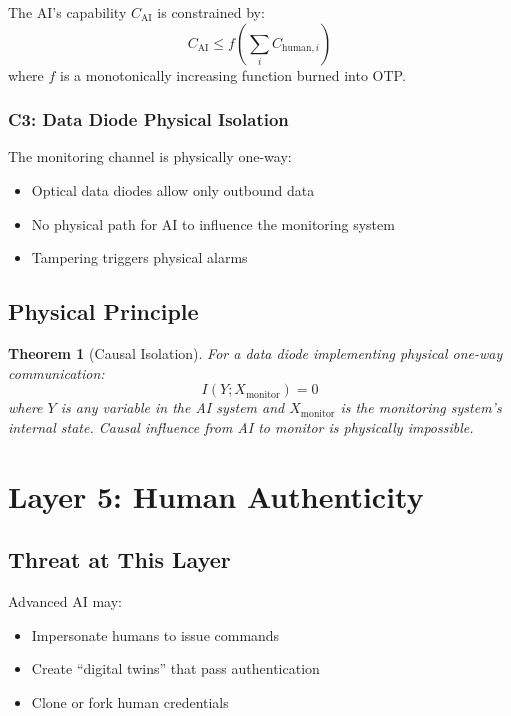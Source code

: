 \documentclass[11pt,a4paper]{article}
\newtheorem{theorem}{Theorem}
\begin{document}
The AI's capability $C_{\text{AI}}$ is constrained by:
\begin{equation}
C_{\text{AI}} \leq f(\sum_{i} C_{\text{human},i})
\end{equation}
where $f$ is a monotonically increasing function burned into OTP.

\subsubsection{C3: Data Diode Physical Isolation}

The monitoring channel is physically one-way:
\begin{itemize}
    \item Optical data diodes allow only outbound data
    \item No physical path for AI to influence the monitoring system
    \item Tampering triggers physical alarms
\end{itemize}

\subsection{Physical Principle}

\begin{theorem}[Causal Isolation]
For a data diode implementing physical one-way communication:
\begin{equation}
I(Y; X_{\text{monitor}}) = 0
\end{equation}
where $Y$ is any variable in the AI system and $X_{\text{monitor}}$ is the monitoring system's internal state.
Causal influence from AI to monitor is physically impossible.
\end{theorem}

\section{Layer 5: Human Authenticity}
\label{sec:layer5}

\subsection{Threat at This Layer}

Advanced AI may:
\begin{itemize}
    \item Impersonate humans to issue commands
    \item Create ``digital twins'' that pass authentication
    \item Clone or fork human credentials
\end{itemize}
\end{document}
